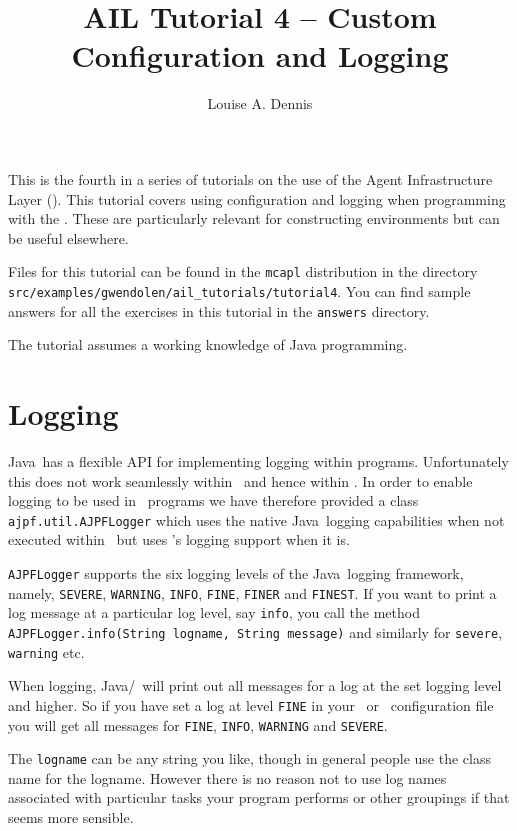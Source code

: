 \documentclass[a4]{article}
\author{Louise A. Dennis}
\title{AIL Tutorial 4 -- Custom Configuration and Logging}
\begin{document}
\maketitle
This is the fourth in a series of tutorials on the use of the Agent Infrastructure Layer (\ail).  This tutorial covers using configuration and logging when programming with the \ail.  These are particularly relevant for constructing environments but can be useful elsewhere.

Files for this tutorial can be found in the \texttt{mcapl} distribution in the directory \texttt{src/examples/gwendolen/ail\_tutorials/tutorial4}.  You can find sample answers for all the exercises in this tutorial in the \texttt{answers} directory.

The tutorial assumes a working knowledge of Java programming.

\section{Logging}
Java\ has a flexible API for implementing logging within programs.  Unfortunately this does not work seamlessly within \jpf\ and hence within \ajpf.  In order to enable logging to be used in \ail\ programs we have therefore provided a class \texttt{ajpf.util.AJPFLogger} which uses the native Java\ logging capabilities when not executed within \ajpf\ but uses \jpf's logging support when it is.

\begin{sloppypar}
\texttt{AJPFLogger} supports the six logging levels of the Java\ logging framework, namely, \texttt{SEVERE}, \texttt{WARNING}, \texttt{INFO}, \texttt{FINE}, \texttt{FINER} and \texttt{FINEST}.  If you want to print a log message at a particular log level, say \texttt{info}, you call the method \texttt{AJPFLogger.info(String logname, String message)} and similarly for \texttt{severe}, \texttt{warning} etc.
\end{sloppypar}

When logging, Java/\jpf\ will print out all messages for a log at the set logging level and higher.  So if you have set a log at level \texttt{FINE} in your \ail\ or \jpf\ configuration file you will get all messages for \texttt{FINE}, \texttt{INFO}, \texttt{WARNING} and \texttt{SEVERE}.

The \texttt{logname} can be any string you like, though in general people use the class name for the logname.  However there is no reason not to use log names associated with particular tasks your program performs or other groupings if that seems more sensible.
\end{document}

